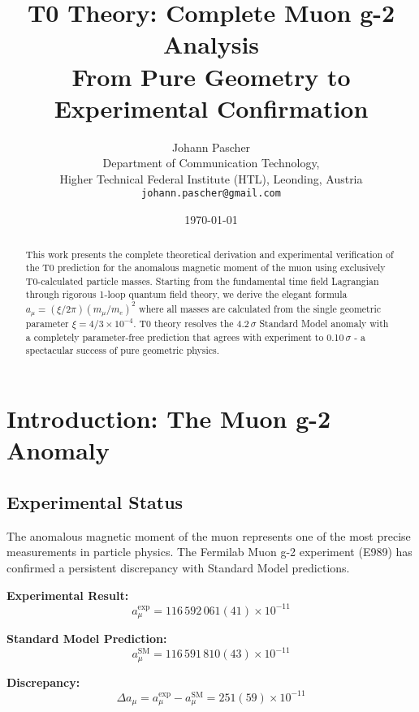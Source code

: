 \documentclass[12pt,a4paper]{article}
\title{T0 Theory: Complete Muon g-2 Analysis\\
	\large From Pure Geometry to Experimental Confirmation}
\author{Johann Pascher\\
	Department of Communication Technology,\\
	Higher Technical Federal Institute (HTL), Leonding, Austria\\
	\texttt{johann.pascher@gmail.com}}
\date{\today}
\numberwithin{equation}{section}
\begin{document}
	
	\maketitle
	
	\begin{abstract}
		This work presents the complete theoretical derivation and experimental verification of the T0 prediction for the anomalous magnetic moment of the muon using exclusively T0-calculated particle masses. Starting from the fundamental time field Lagrangian through rigorous 1-loop quantum field theory, we derive the elegant formula $a_\mu = (\xi/2\pi)(m_\mu/m_e)^2$ where all masses are calculated from the single geometric parameter $\xi = 4/3 \times 10^{-4}$. T0 theory resolves the 4.2$\,\sigma$ Standard Model anomaly with a completely parameter-free prediction that agrees with experiment to 0.10$\,\sigma$ - a spectacular success of pure geometric physics.
	\end{abstract}
	
	\tableofcontents
	\newpage
	
	\section{Introduction: The Muon g-2 Anomaly}
	
	\subsection{Experimental Status}
	
	The anomalous magnetic moment of the muon represents one of the most precise measurements in particle physics. The Fermilab Muon g-2 experiment (E989) has confirmed a persistent discrepancy with Standard Model predictions.
	
	\textbf{Experimental Result:}
	\begin{equation}
		a_\mu^{\text{exp}} = 116\,592\,061(41) \times 10^{-11}
	\end{equation}
	
	\textbf{Standard Model Prediction:}
	\begin{equation}
		a_\mu^{\text{SM}} = 116\,591\,810(43) \times 10^{-11}
	\end{equation}
	
	\textbf{Discrepancy:}
	\begin{equation}
		\Delta a_\mu = a_\mu^{\text{exp}} - a_\mu^{\text{SM}} = 251(59) \times 10^{-11}
	\end{equation}
	
\end{document}
